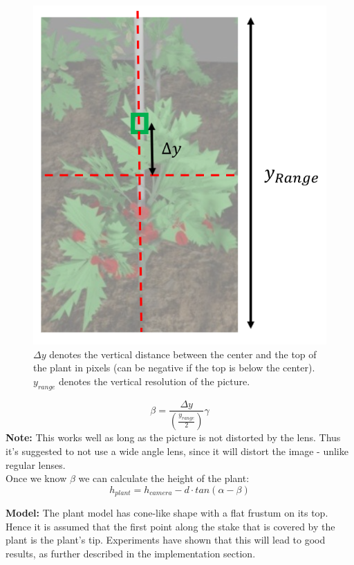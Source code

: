    \begin{figure}[H]
       \centering
       \includegraphics[scale=0.6]{getTopAngle.PNG}
       \caption{$\Delta y$ denotes the vertical distance between the center and the top of the plant in pixels (can be negative if the top is below the center). $y_{range}$ denotes the vertical resolution of the picture.}
       \label{fig:getTopAngle}
   \end{figure}
$$\beta = \frac{\Delta y}{(\frac{y_{range}}{2})}\gamma$$
\textbf{Note:} This works well as long as the picture is not distorted by the lens.
Thus it's suggested to not use a wide angle lens, since it will distort the image
- unlike regular lenses.\\
Once we know $\beta$ we can calculate the height of the plant:
$$h_{plant} = h_{camera} - d\cdot tan(\alpha - \beta)$$

\textbf{Model:} The plant model has cone-like shape with a flat frustum on its top.
Hence it is assumed that the first point along the stake that is covered by the plant
is the plant's tip.
Experiments have shown that this will lead to good results, as further described
in the implementation section.\\

